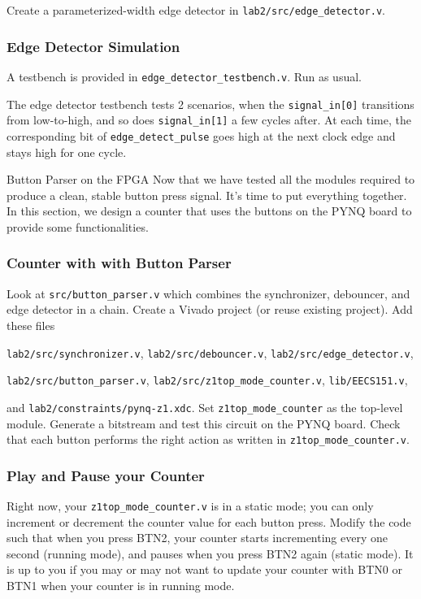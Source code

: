 \documentclass[11pt]{article}
\makeatletter
\renewcommand{\subsection}
{\@startsection {subsection}{1}{0pt}
 {-1ex}
 {0.5ex}
 {\bfseries\normalsize}}
\makeatother
\begin{document}
Create a parameterized-width edge detector in \verb|lab2/src/edge_detector.v|.

\subsubsection{Edge Detector Simulation}
A testbench is provided in \verb|edge_detector_testbench.v|. Run as usual.

The edge detector testbench tests 2 scenarios, when the \verb|signal_in[0]| transitions from low-to-high, and so does \verb|signal_in[1]| a few cycles after. At each time, the corresponding bit of \verb|edge_detect_pulse| goes high at the next clock edge and stays high for one cycle.

\subsection{Button Parser on the FPGA}
Now that we have tested all the modules required to produce a clean, stable button press signal. It's time to put everything together. In this section, we design a counter that uses the buttons on the PYNQ board to provide some functionalities.

\subsubsection{Counter with with Button Parser}
Look at \verb|src/button_parser.v| which combines the synchronizer, debouncer, and edge detector in a chain.
Create a Vivado project (or reuse existing project). Add these files

\verb|lab2/src/synchronizer.v|, \verb|lab2/src/debouncer.v|, \verb|lab2/src/edge_detector.v|,

\verb|lab2/src/button_parser.v|, \verb|lab2/src/z1top_mode_counter.v|, \verb|lib/EECS151.v|,

and \verb|lab2/constraints/pynq-z1.xdc|. Set \verb|z1top_mode_counter| as the top-level module. Generate a bitstream and test this circuit on the PYNQ board. Check that each button performs the right action as written in \texttt{z1top\_mode\_counter.v}.

\subsubsection{Play and Pause your Counter}

Right now, your \texttt{z1top\_mode\_counter.v} is in a static mode; you can only increment or decrement the counter value for each button press. Modify the code such that when you press BTN2, your counter starts incrementing every one second (running mode), and pauses when you press BTN2 again (static mode). It is up to you if you may or may not want to update your counter with BTN0 or BTN1 when your counter is in running mode.
\end{document}
